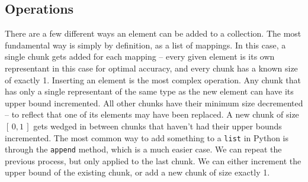\documentclass[a4paper, 16pt, oneside]{Thesis}
\begin{document}
\subsection{Operations}\label{operations}

There are a few different ways an element can be added to a collection.
The most fundamental way is simply by definition, as a list of mappings.
In this case, a single chunk gets added for each mapping -- every given
element is its own representant in this case for optimal accuracy, and
every chunk has a known size of exactly 1. Inserting an element is the
most complex operation. Any chunk that has only a single representant of
the same type as the new element can have its upper bound incremented.
All other chunks have their minimum size decremented -- to reflect that
one of its elements may have been replaced. A new chunk of size
\([\,0, 1\,]\) gets wedged in between chunks that haven't had their
upper bounds incremented. The most common way to add something to a
\texttt{list} in Python is through the \texttt{append} method, which is
a much easier case. We can repeat the previous process, but only applied
to the last chunk. We can either increment the upper bound of the
existing chunk, or add a new chunk of size exactly 1.
\end{document}
